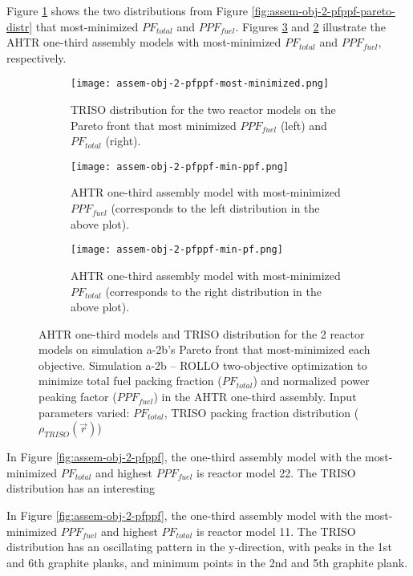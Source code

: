 Figure \ref{fig:assem-obj-2-pfppf-distr-most-minimized} shows the two distributions from 
Figure \ref{fig:assem-obj-2-pfppf-pareto-distr} that most-minimized $PF_{total}$ and $PPF_{fuel}$. 
Figures \ref{fig:assem-obj-2-pfppf-min-pf} and \ref{fig:assem-obj-2-pfppf-min-ppf} 
illustrate the \gls{AHTR} one-third assembly models with most-minimized $PF_{total}$ and 
$PPF_{fuel}$, respectively. 
\begin{figure}[htbp!]
    \centering
    \begin{subfigure}{\textwidth}
        \texttt{[image: assem-obj-2-pfppf-most-minimized.png]}
        \caption{TRISO distribution for the two reactor models on the Pareto front
        that most minimized $PPF_{fuel}$ (left) and $PF_{total}$ (right).}
        \label{fig:assem-obj-2-pfppf-distr-most-minimized}
    \end{subfigure}
    \begin{subfigure}{0.45\textwidth}
        \texttt{[image: assem-obj-2-pfppf-min-ppf.png]}
        \caption{\gls{AHTR} one-third assembly model with most-minimized $PPF_{fuel}$
        (corresponds to the left distribution in the above plot).}
        \label{fig:assem-obj-2-pfppf-min-ppf} 
    \end{subfigure}
    \begin{subfigure}{0.45\textwidth}
        \texttt{[image: assem-obj-2-pfppf-min-pf.png]}
        \caption{\gls{AHTR} one-third assembly model with most-minimized $PF_{total}$ 
        (corresponds to the right distribution in the above plot).}
        \label{fig:assem-obj-2-pfppf-min-pf} 
    \end{subfigure}
    \caption{AHTR one-third models and TRISO distribution for the 2 reactor models on 
    simulation a-2b's Pareto front that most-minimized each objective.
    Simulation a-2b -- ROLLO two-objective optimization to minimize total fuel 
    packing fraction ($PF_{total}$) and normalized power peaking factor ($PPF_{fuel}$) 
    in the \gls{AHTR} one-third assembly. 
    Input parameters varied: $PF_{total}$, TRISO packing fraction distribution
    ($\rho_{TRISO}(\vec{r})$)}
    \label{fig:assem-obj-2-pfppf-most-minimized}
\end{figure}

In Figure \ref{fig:assem-obj-2-pfppf}, the one-third assembly model with 
the most-minimized $PF_{total}$ and highest $PPF_{fuel}$ is reactor model 22. 
The TRISO distribution has an interesting 

In Figure \ref{fig:assem-obj-2-pfppf}, the one-third assembly model with 
the most-minimized $PPF_{fuel}$ and highest $PF_{total}$ is reactor model 11.
The TRISO distribution has an oscillating pattern in the y-direction, with peaks  
in the 1st and 6th graphite planks, and minimum points in the 2nd and 5th graphite 
plank. 

